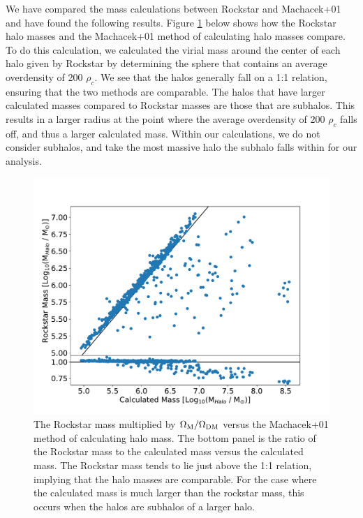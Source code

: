 \documentclass[11pt]{article}
\begin{document}
We have compared the mass calculations between Rockstar and Machacek+01 and have found the following results. Figure \ref{fig:compare_mass} below shows how the Rockstar halo masses and the Machacek+01 method of calculating halo masses compare. To do this calculation, we calculated the virial mass around the center of each halo given by Rockstar by determining the sphere that contains an average overdensity of 200 $\rho_{c}$. We see that the halos generally fall on a 1:1 relation, ensuring that the two methods are comparable. The halos that have larger calculated masses compared to Rockstar masses are those that are subhalos. This results in a larger radius at the point where the average overdensity of 200 $\rho_{c}$ falls off, and thus a larger calculated mass. Within our calculations, we do not consider subhalos, and take the most massive halo the subhalo falls within for our analysis.

\begin{figure}[ht!]
	\centering
	\includegraphics[keepaspectratio=true, scale=0.4]{images/compare_mass_ratio.pdf}
  \caption{\label{fig:compare_mass} The Rockstar mass multiplied by $\Omega_{\rm M} / \Omega_{\rm DM}$ versus the Machacek+01 method of calculating halo mass. The bottom panel is the ratio of the Rockstar mass to the calculated mass versus the calculated mass. The Rockstar mass tends to lie just above the 1:1 relation, implying that the halo masses are comparable. For the case where the calculated mass is much larger than the rockstar mass, this occurs when the halos are subhalos of a larger halo.}
\end{figure}
\end{document}
